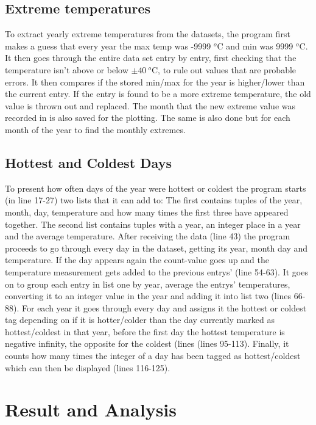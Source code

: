 \documentclass[12pt]{article}
\numberwithin{equation}{section}
\begin{document}
\subsection{Extreme temperatures}

To extract yearly extreme temperatures from the datasets, the program first makes a guess that every year the max temp was -9999 $^o$C and min was 9999 $^o$C. It then goes through the entire data set entry by entry, first checking that the temperature isn't above or below $\pm 40 ~^o$C, to rule out values that are probable errors. It then compares if the stored min/max for the year is higher/lower than the current entry. If the entry is found to be a more extreme temperature, the old value is thrown out and replaced. The month that the new extreme value was recorded in is also saved for the plotting. The same is also done but for each month of the year to find the monthly extremes.

\subsection{Hottest and Coldest Days}

To present how often days of the year were hottest or coldest the program starts (in line 17-27) two lists that it can add to: The first contains tuples of the year, month, day, temperature and how many times the first three have appeared together. The second list contains tuples with a year, an integer place in a year and the average temperature. After receiving the data (line 43) the program proceeds to go through every day in the dataset, getting its year, month day and temperature. If the day appears again the count-value goes up and the temperature measurement gets added to the previous entrys' (line 54-63). It goes on to group each entry in list one by year, average the entrys' temperatures, converting it to an integer value in the year and adding it into list two (lines 66-88). For each year it goes through every day and assigns it the hottest or coldest tag depending on if it is hotter/colder than the day currently marked as hottest/coldest in that year, before the first day the hottest temperature is negative infinity, the opposite for the coldest (lines (lines 95-113). Finally, it counts how many times the integer of a day has been tagged as hottest/coldest which can then be displayed (lines 116-125).

\section{Result and Analysis}
\end{document}
